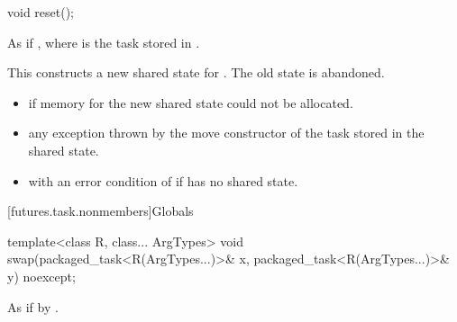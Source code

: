 %
\begin{itemdecl}
void reset();
\end{itemdecl}

\begin{itemdescr}
\pnum
\effects As if , where
 is the task stored in
. \begin{note} This constructs a new shared state for . The
old state is abandoned. \end{note}

\pnum
\throws
\begin{itemize}
\item {} if memory for the new shared state could not be allocated.
\item any exception thrown by the move constructor of the task stored in the shared
state.
\item {} with an error condition of  if 
has no shared state.
\end{itemize}
\end{itemdescr}

[futures.task.nonmembers]{Globals}

%
\begin{itemdecl}
template<class R, class... ArgTypes>
  void swap(packaged_task<R(ArgTypes...)>& x, packaged_task<R(ArgTypes...)>& y) noexcept;
\end{itemdecl}

\begin{itemdescr}
\pnum
\effects As if by .
\end{itemdescr}
